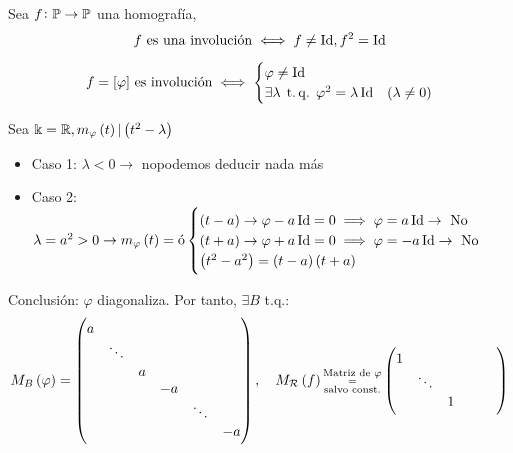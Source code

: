 \begin{defi}
    Sea $f \colon \mathbb{P} \to \mathbb{P}$ una homografía,
    \[ f\text{ es una involución} \iff f \neq \operatorname{Id}, f^2 = \operatorname{Id} \]
\end{defi}
\begin{obs}
    \[
        f = [\varphi]\text{ es involución} \iff
        \begin{cases}
            \varphi \neq \operatorname{Id}  \\
            \exists\lambda\operatorname{\;t.q.\;}\varphi^2=\lambda\operatorname{Id} & \left( \lambda \neq 0 \right)
        \end{cases}
    \]
\end{obs}
\begin{obs}
    Sea $\Bbbk = \mathbb{R}, m_\varphi\left( t\right) | \left( t^2-\lambda\right)$
    \begin{itemize}
        \item Caso 1: $\lambda<0 \rightarrow$ nopodemos deducir nada más 
        \item Caso 2: $\lambda = a^2>0 \rightarrow m_\varphi\left( t\right) = \text{ó}
        \begin{cases}
            \left( t-a\right) \rightarrow \varphi -a\operatorname{Id}=0\implies\varphi=a\operatorname{Id} \rightarrow \text{ No} \\
            \left( t+a\right) \rightarrow \varphi +a\operatorname{Id}=0\implies\varphi=-a\operatorname{Id} \rightarrow \text{ No} \\
            \left( t^2-a^2\right) = \left( t-a\right)\left( t+a\right)
        \end{cases}$
    \end{itemize}
    Conclusión: $\varphi$ diagonaliza.
    Por tanto, $\exists B$ t.q.:
    \begin{gather*}
        M_B\left(\varphi\right) =
        \begin{pmatrix}
            a & & & & & \\
            & \ddots & & & & \\
            & & a & & & \\
            & & & -a & & \\
            & & & & \ddots & \\
            & & & & & -a
        \end{pmatrix}, \quad
        M_{\mathcal{R}}\left( f\right) \substack{\text{Matriz de } \varphi \\=\\ \text{salvo const.}} \begin{pmatrix}
            1 & & & & & \\
            & \ddots & & & & \\
            & & 1 & & & \\

\end{pmatrix}
\end{gather*}
\end{obs}
